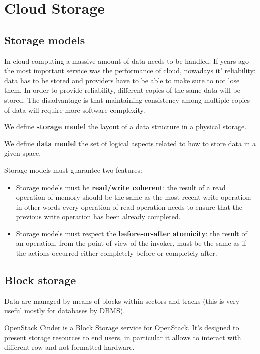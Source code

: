 \section{Cloud Storage}


\subsection{Storage models}
    In cloud computing a massive amount of data needs to be handled. If years ago the most important service was the performance of cloud, nowadays it' reliability: data has to be stored and providers have to be able to make sure to not lose them.
    In order to provide reliability, different copies of the same data will be stored. The disadvantage is that maintaining consistency among multiple copies of data will require more software complexity.
    
    We define \textbf{storage model} the layout of a data structure in a physical storage.
    
    We define \textbf{data model} the set of logical aspects related to how to store data in a given space.
    
    Storage models must guarantee two features:
    \begin{itemize}
        \item Storage models must be \textbf{read/write coherent}: the result of a read operation of memory should be the same as the most recent write operation; in other words every operation of read operation needs to ensure that the previous write operation has been already completed.
        \item Storage models must respect the \textbf{before-or-after atomicity}: the result of an operation, from the point of view of the invoker, must be the same as if the actions occurred either completely before or completely after.
    \end{itemize}

    
\subsection{Block storage}
    Data are managed by means of blocks within sectors and tracks (this is very useful mostly for databases by DBMS).
    
    OpenStack Cinder is a Block Storage service for OpenStack. It's designed to present storage resources to end users, in particular it allows to interact with different row and not formatted hardware. 
    
